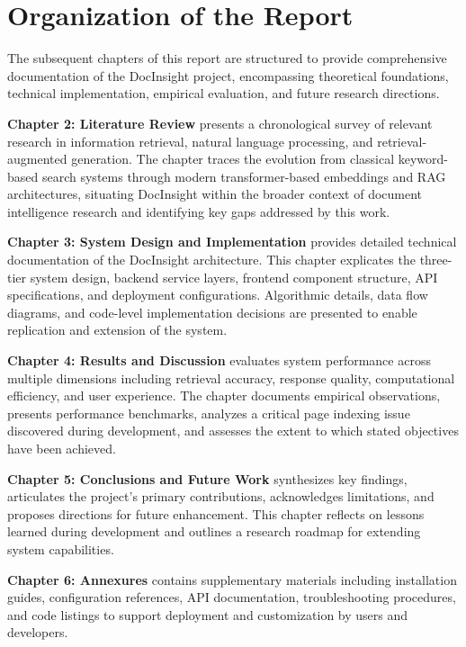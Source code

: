 \section{Organization of the Report}

The subsequent chapters of this report are structured to provide comprehensive documentation of the DocInsight project, encompassing theoretical foundations, technical implementation, empirical evaluation, and future research directions.

\textbf{Chapter 2: Literature Review} presents a chronological survey of relevant research in information retrieval, natural language processing, and retrieval-augmented generation. The chapter traces the evolution from classical keyword-based search systems through modern transformer-based embeddings and RAG architectures, situating DocInsight within the broader context of document intelligence research and identifying key gaps addressed by this work.

\textbf{Chapter 3: System Design and Implementation} provides detailed technical documentation of the DocInsight architecture. This chapter explicates the three-tier system design, backend service layers, frontend component structure, API specifications, and deployment configurations. Algorithmic details, data flow diagrams, and code-level implementation decisions are presented to enable replication and extension of the system.

\textbf{Chapter 4: Results and Discussion} evaluates system performance across multiple dimensions including retrieval accuracy, response quality, computational efficiency, and user experience. The chapter documents empirical observations, presents performance benchmarks, analyzes a critical page indexing issue discovered during development, and assesses the extent to which stated objectives have been achieved.

\textbf{Chapter 5: Conclusions and Future Work} synthesizes key findings, articulates the project's primary contributions, acknowledges limitations, and proposes directions for future enhancement. This chapter reflects on lessons learned during development and outlines a research roadmap for extending system capabilities.

\textbf{Chapter 6: Annexures} contains supplementary materials including installation guides, configuration references, API documentation, troubleshooting procedures, and code listings to support deployment and customization by users and developers.